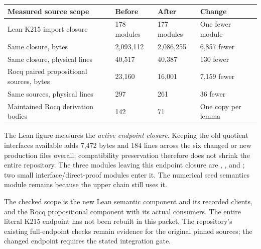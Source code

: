 \begin{center}
\begin{tabularx}{\textwidth}{@{}p{}p{}p{}X@{}}
\toprule
Measured source scope & Before & After & Change \\
\midrule
Lean K215 import closure & 178 modules & 177 modules & One fewer module \\
Same closure, bytes & 2,093,112 & 2,086,255 & 6,857 fewer \\
Same closure, physical lines & 40,517 & 40,387 & 130 fewer \\
Rocq paired propositional sources, bytes & 23,160 & 16,001 & 7,159 fewer \\
Same sources, physical lines & 297 & 261 & 36 fewer \\
Maintained Rocq derivation bodies & 142 & 71 & One copy per lemma \\
\bottomrule
\end{tabularx}
\end{center}

The Lean figure measures the \emph{active endpoint closure}. Keeping the old
quotient interfaces available adds 7,472 bytes and 184 lines across the six
changed or new production files overall; compatibility preservation therefore
does not shrink the entire repository. The three modules leaving this endpoint
closure are , , and ;
two small interface/direct-proof modules enter it. The numerical seed semantics
module remains because the upper chain still uses it.

The checked scope is the new Lean semantic component and its recorded clients,
and the Rocq propositional component with its actual consumers. The entire
literal K215 endpoint has not been rebuilt in this packet. The repository's
existing full-endpoint checks remain evidence for the original pinned sources;
the changed endpoint requires the stated integration gate.
